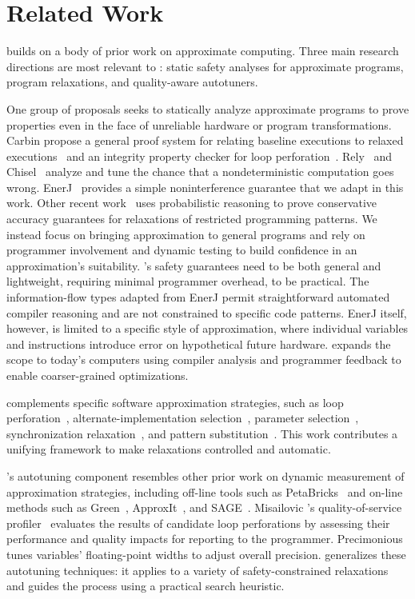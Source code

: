 \section{Related Work}
\label{sec:related}

\sysname builds on a body of prior work on approximate
computing. Three main research directions are most
relevant to \sysname: static safety analyses for approximate programs,
program relaxations, and quality-aware autotuners.

One group of proposals seeks to statically analyze approximate programs to
prove properties even in the face of unreliable hardware or program
transformations.
Carbin \etal propose a general proof system for relating baseline executions
to relaxed executions~\cite{carbin-pldi}
and an integrity property checker for loop perforation~\cite{carbin-pepm}.
Rely~\cite{rely} and Chisel~\cite{chisel} analyze and tune the chance that a
nondeterministic computation goes wrong.
EnerJ~\cite{enerj} provides a simple noninterference guarantee that we adapt
in this work.
Other recent
work~\cite{sasa-sas11, zhu-popl12} uses probabilistic reasoning to prove
conservative accuracy guarantees for relaxations of restricted programming
patterns.
We instead focus on bringing approximation to general programs and rely on
programmer involvement and dynamic testing to build confidence in an
approximation's suitability.
\sysname's safety guarantees need to be both general and lightweight,
requiring minimal programmer overhead, to be practical. The information-flow
types adapted from EnerJ permit straightforward automated compiler
reasoning and are not constrained to specific code patterns.
%
EnerJ itself, however, is limited to a specific style of approximation, where
individual variables and instructions introduce error on hypothetical future
hardware.
\sysname expands the scope to today's computers using compiler analysis and
programmer feedback to enable coarser-grained optimizations.

\sysname complements specific software approximation strategies,
such as loop perforation~\cite{perforation},
alternate-implementation selection~\cite{petabricks, green, taco-soc}, parameter
selection~\cite{dynamicknobs}, synchronization relaxation~\cite{quickstep,
dubstep, races-ibm, rinard-hotpar}, and pattern
substitution~\cite{paraprox}. This work contributes a
unifying framework to make relaxations controlled and
automatic.

\sysname's autotuning component resembles other prior work on dynamic
measurement of approximation strategies, including off-line tools such as
PetaBricks~\cite{ansel-autotuning, petabricks} and on-line methods
such as Green~\cite{green}, ApproxIt~\cite{approxit}, and SAGE~\cite{sage}.
Misailovic
\etal's quality-of-service profiler~\cite{qosprof} evaluates the results of
candidate loop perforations by assessing their performance and quality impacts
for reporting to the programmer.
Precimonious~\cite{precimonious} tunes variables' floating-point widths to
adjust overall precision.
%
\sysname generalizes these autotuning
techniques: it applies to a variety of safety-constrained
relaxations and guides the process using a practical search
heuristic.

